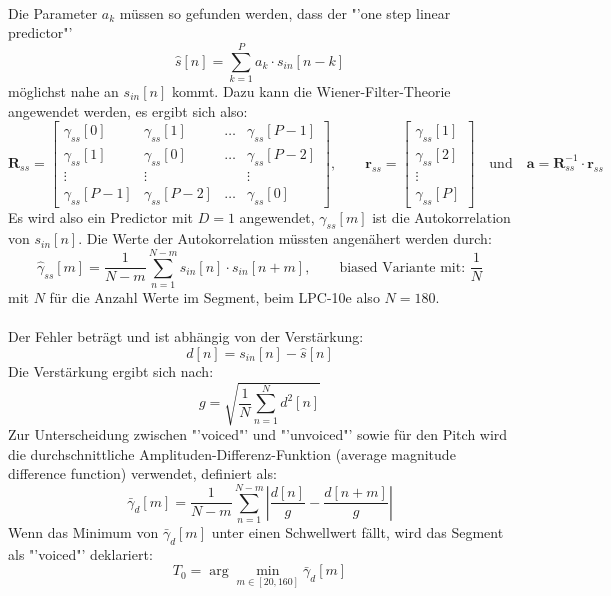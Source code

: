 ~\\
Die Parameter $a_k$ müssen so gefunden werden, dass der "'one step linear predictor"'
\[ \hat{s}[n] = \sum_{k=1}^{P}a_k\cdot s_{in}[n-k] \]
möglichst nahe an $s_{in}[n]$ kommt. Dazu kann die Wiener-Filter-Theorie angewendet werden, es ergibt sich also:
\[ \textbf{R}_{ss} = \begin{bmatrix}
	\gamma_{ss}[0]	& \gamma_{ss}[1]	& \ldots	& \gamma_{ss}[P-1]\\
	\gamma_{ss}[1]	& \gamma_{ss}[0]	& \ldots	& \gamma_{ss}[P-2]\\
	\vdots			& \vdots			&			& \vdots\\
	\gamma_{ss}[P-1]& \gamma_{ss}[P-2]	& \ldots	& \gamma_{ss}[0]
\end{bmatrix}, \qquad 
 \textbf{r}_{ss} = \begin{bmatrix}
	\gamma_{ss}[1]\\
	\gamma_{ss}[2]\\
	\vdots\\
	\gamma_{ss}[P]
\end{bmatrix} \quad \text{und} \quad \textbf{a} = \textbf{R}_{ss}^{-1}\cdot \textbf{r}_{ss} \]
Es wird also ein Predictor mit $D=1$ angewendet, $\gamma_{ss}[m]$ ist die Autokorrelation von $s_{in}[n]$.
Die Werte der Autokorrelation müssten angenähert werden durch:
\[ \hat{\gamma}_{ss}[m] = \frac{1}{N-m} \sum_{n=1}^{N-m}s_{in}[n]\cdot s_{in}[n+m], \qquad \text{biased Variante mit: } \frac{1}{N}\]
mit $N$ für die Anzahl Werte im Segment, beim LPC-10e also $N=180$.\\\\
Der Fehler beträgt und ist abhängig von der Verstärkung:
\[ d[n] = s_{in}[n]-\hat{s}[n] \]
Die Verstärkung ergibt sich nach:
\[ g=\sqrt{\frac{1}{N}\sum_{n=1}^{N}d^2[n]} \]
Zur Unterscheidung zwischen "'voiced"' und "'unvoiced"' sowie für den Pitch
wird die durchschnittliche Amplituden-Differenz-Funktion (average magnitude difference
function) verwendet, definiert als:
\[ \bar{\gamma}_d[m]= \frac{1}{N-m} \sum_{n=1}^{N-m}\left|\frac{d[n]}{g} -
	\frac{d[n+m]}{g}\right| \] 
Wenn das Minimum von $\bar{\gamma}_d[m]$ unter einen Schwellwert fällt, wird das
Segment als "'voiced"' deklariert:
\[ T_0 = \arg \min_{m\in[20,160]} \bar{\gamma}_d[m] \]

